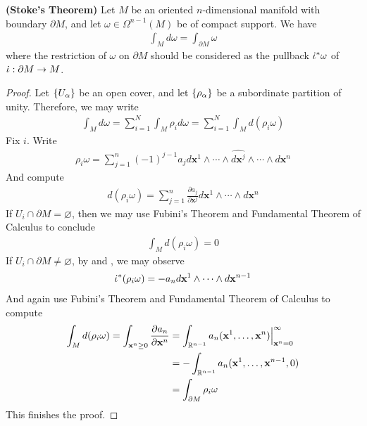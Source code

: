 \documentclass{report}
\begin{document}
\begin{theorem}
\textbf{(Stoke's Theorem)} Let $M$ be an oriented  $n$-dimensional manifold with  boundary $\partial M$, and let $\omega \in \Omega^{n-1}(M)$ be of compact support. We have 
\begin{align*}
\int_M d\omega = \int_{\partial M} \omega 
\end{align*}
where the restriction of $\omega$ on $\partial M$ should be considered as the pullback $\dot{\iota}^*\omega $ of $\dot{\iota}: \partial M\rightarrow M $. 
\end{theorem}
\begin{proof}
Let $\{ U_\alpha  \}$ be an open cover, and let $\{ \rho_\alpha  \}$ be a subordinate partition of unity. Therefore, we may write 
\begin{align*}
\int_M d\omega= \sum_{i=1}^N \int_M \rho_i d\omega= \sum_{i=1}^N \int_M d(\rho_i \omega)
\end{align*}
Fix $i$. Write   
\begin{align}
\label{fi}
\rho_i \omega= \sum_{j=1}^n (-1)^{j-1}a_j d\textbf{x}^1 \wedge  \cdots \wedge  \widehat{d \textbf{x}^j}  \wedge  \cdots \wedge   d\textbf{x}^n 
\end{align}
And compute 
\begin{align*}
d (\rho_i \omega)= \sum_{j=1}^n \frac{\partial a_j}{\partial \textbf{x}^j} d\textbf{x}^1 \wedge  \cdots \wedge  d\textbf{x}^n  
\end{align*}
If $U_i\cap  \partial M= \varnothing$, then we may use Fubini's Theorem and Fundamental Theorem of Calculus to conclude 
\begin{align*}
\int_M d(\rho_i \omega)=0 
\end{align*}
If  $U_i \cap \partial M \neq \varnothing$,  by  and , we may observe 
\begin{align*}
\dot{\iota}^* (\rho_i \omega) = - a_n d\textbf{x}^1 \wedge  \cdots \wedge  d\textbf{x}^{n-1}  
\end{align*}
And again use Fubini's Theorem and Fundamental Theorem of Calculus to compute 
\begin{align*}
\int_M d(\rho_i \omega)=  \int_{\textbf{x}^n \geq 0} \frac{\partial a_n}{\partial \textbf{x}^n} &= \int_{\mathbb{R}^{n-1}} a_n(\textbf{x}^1,\dots ,\textbf{x}^n)\Big|_{\textbf{x}^n=0}^{\infty } \\
&=-\int_{\mathbb{R}^{n-1}} a_n (\textbf{x}^1,\dots ,\textbf{x}^{n-1},0) \\
&=\int_{\partial M} \rho_i \omega
\end{align*}
This finishes the proof.
\end{proof}
\end{document}
